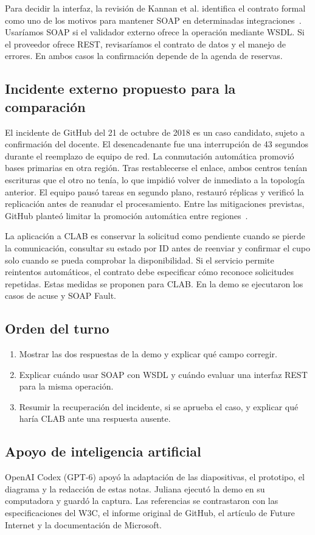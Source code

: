 Para decidir la interfaz, la revisión de Kannan et al. identifica el contrato formal como uno de los motivos para mantener SOAP en determinadas integraciones~\cite{kannan-soap-rest-2026}. Usaríamos SOAP si el validador externo ofrece la operación mediante WSDL. Si el proveedor ofrece REST, revisaríamos el contrato de datos y el manejo de errores. En ambos casos la confirmación depende de la agenda de reservas.

\subsection{Incidente externo propuesto para la comparación}
El incidente de GitHub del 21 de octubre de 2018 es un caso candidato, sujeto a confirmación del docente. El desencadenante fue una interrupción de 43 segundos durante el reemplazo de equipo de red. La conmutación automática promovió bases primarias en otra región. Tras restablecerse el enlace, ambos centros tenían escrituras que el otro no tenía, lo que impidió volver de inmediato a la topología anterior. El equipo pausó tareas en segundo plano, restauró réplicas y verificó la replicación antes de reanudar el procesamiento. Entre las mitigaciones previstas, GitHub planteó limitar la promoción automática entre regiones~\cite{warner-github-incidente-2018}.

La aplicación a CLAB es conservar la solicitud como pendiente cuando se pierde la comunicación, consultar su estado por ID antes de reenviar y confirmar el cupo solo cuando se pueda comprobar la disponibilidad. Si el servicio permite reintentos automáticos, el contrato debe especificar cómo reconoce solicitudes repetidas. Estas medidas se proponen para CLAB. En la demo se ejecutaron los casos de acuse y SOAP Fault.

\subsection{Orden del turno}
\begin{enumerate}
  \item Mostrar las dos respuestas de la demo y explicar qué campo corregir.
  \item Explicar cuándo usar SOAP con WSDL y cuándo evaluar una interfaz REST para la misma operación.
  \item Resumir la recuperación del incidente, si se aprueba el caso, y explicar qué haría CLAB ante una respuesta ausente.
\end{enumerate}

\subsection{Apoyo de inteligencia artificial}
OpenAI Codex (GPT-6) apoyó la adaptación de las diapositivas, el prototipo, el diagrama y la redacción de estas notas. Juliana ejecutó la demo en su computadora y guardó la captura. Las referencias se contrastaron con las especificaciones del W3C, el informe original de GitHub, el artículo de Future Internet y la documentación de Microsoft.
